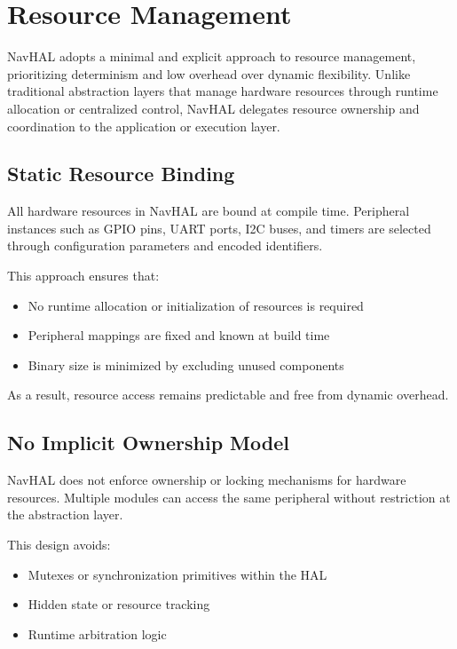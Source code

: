 \section{Resource Management}
\label{sec:navhal_resource_management}

NavHAL adopts a minimal and explicit approach to resource management, prioritizing determinism and low overhead over dynamic flexibility. Unlike traditional abstraction layers that manage hardware resources through runtime allocation or centralized control, NavHAL delegates resource ownership and coordination to the application or execution layer.

\subsection*{Static Resource Binding}

All hardware resources in NavHAL are bound at compile time. Peripheral instances such as GPIO pins, UART ports, I2C buses, and timers are selected through configuration parameters and encoded identifiers.

This approach ensures that:
\begin{itemize}
    \item No runtime allocation or initialization of resources is required
    \item Peripheral mappings are fixed and known at build time
    \item Binary size is minimized by excluding unused components
\end{itemize}

As a result, resource access remains predictable and free from dynamic overhead.

\subsection*{No Implicit Ownership Model}

NavHAL does not enforce ownership or locking mechanisms for hardware resources. Multiple modules can access the same peripheral without restriction at the abstraction layer.

This design avoids:
\begin{itemize}
    \item Mutexes or synchronization primitives within the HAL
    \item Hidden state or resource tracking
    \item Runtime arbitration logic
\end{itemize}

